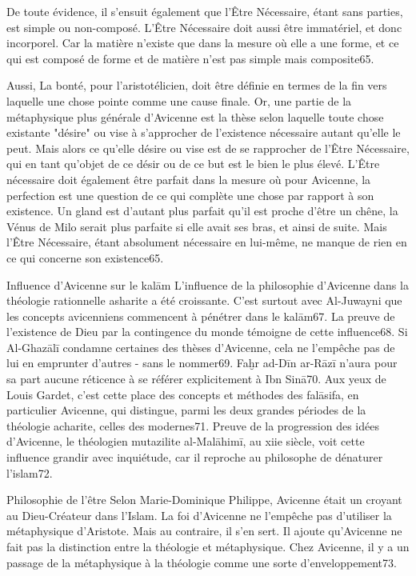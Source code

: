 De toute évidence, il s'ensuit également que l'Être Nécessaire, étant sans parties, est simple ou non-composé. L'Être Nécessaire doit aussi être immatériel, et donc incorporel. Car la matière n'existe que dans la mesure où elle a une forme, et ce qui est composé de forme et de matière n'est pas simple mais composite65.

Aussi, La bonté, pour l'aristotélicien, doit être définie en termes de la fin vers laquelle une chose pointe comme une cause finale. Or, une partie de la métaphysique plus générale d'Avicenne est la thèse selon laquelle toute chose existante "désire" ou vise à s'approcher de l'existence nécessaire autant qu'elle le peut. Mais alors ce qu'elle désire ou vise est de se rapprocher de l'Être Nécessaire, qui en tant qu'objet de ce désir ou de ce but est le bien le plus élevé. L'Être nécessaire doit également être parfait dans la mesure où pour Avicenne, la perfection est une question de ce qui complète une chose par rapport à son existence. Un gland est d'autant plus parfait qu'il est proche d'être un chêne, la Vénus de Milo serait plus parfaite si elle avait ses bras, et ainsi de suite. Mais l'Être Nécessaire, étant absolument nécessaire en lui-même, ne manque de rien en ce qui concerne son existence65.

Influence d'Avicenne sur le kalām
L'influence de la philosophie d'Avicenne dans la théologie rationnelle asharite a été croissante. C'est surtout avec Al-Juwayni que les concepts avicenniens commencent à pénétrer dans le kalām67. La preuve de l'existence de Dieu par la contingence du monde témoigne de cette influence68. Si Al-Ghazālī condamne certaines des thèses d'Avicenne, cela ne l'empêche pas de lui en emprunter d'autres - sans le nommer69. Faḫr ad-Dīn ar-Rāzī n'aura pour sa part aucune réticence à se référer explicitement à Ibn Sinā70. Aux yeux de Louis Gardet, c'est cette place des concepts et méthodes des falāsifa, en particulier Avicenne, qui distingue, parmi les deux grandes périodes de la théologie acharite, celles des modernes71. Preuve de la progression des idées d'Avicenne, le théologien mutazilite al-Malāhimī, au xiie siècle, voit cette influence grandir avec inquiétude, car il reproche au philosophe de dénaturer l'islam72.

Philosophie de l'être
Selon Marie-Dominique Philippe, Avicenne était un croyant au Dieu-Créateur dans l’Islam. La foi d’Avicenne ne l’empêche pas d'utiliser la métaphysique d’Aristote. Mais au contraire, il s’en sert. Il ajoute qu’Avicenne ne fait pas la distinction entre la théologie et métaphysique. Chez Avicenne, il y a un passage de la métaphysique à la théologie comme une sorte d’enveloppement73.

